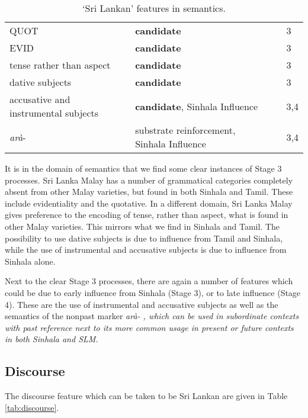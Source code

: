 \begin{table}[h!]
\centering
\begin{tabular}{p{4cm}p{4cm}p{2cm}l}
\hline
QUOT & \textbf{candidate} & \tiny \citet[340-346]{Nordhoff2009}&  3 \\
EVID & \textbf{candidate}  &\tiny \citet[337-340]{Nordhoff2009}&  3 \\
tense rather than aspect &   \textbf{candidate} & &  3 \\
dative subjects & \textbf{candidate}  &\tiny \citet[421-430]{Nordhoff2009}& 3 \\
\hline
accusative and instrumental subjects & \textbf{candidate}, Sinhala Influence & \tiny \citet[421-430]{Nordhoff2009} &  3,4 \\
 \emph{arà}- & substrate reinforcement, Sinhala Influence & \tiny \citet[253]{Nordhoff2009} &  3,4 \\
\end{tabular}
\caption{`Sri Lankan' features in semantics.}
\label{tab:semantics}
\end{table}

It is in the domain of semantics that we find some clear instances of Stage 3 processes. Sri Lanka Malay has a number of grammatical categories completely absent from other Malay varieties, but found in both Sinhala and Tamil. These include  evidentiality and the quotative.  
In a different domain, Sri Lanka Malay gives preference to the encoding of tense, rather than aspect, what is found in other Malay varieties. This mirrors what we find in Sinhala and Tamil. The possibility to use dative subjects is due to influence from Tamil and Sinhala, while the use of instrumental and accusative subjects is due to influence from Sinhala alone.

Next to the clear Stage 3 processes, there are again a number of features which could be due to early influence from Sinhala (Stage 3), or to late influence (Stage 4). These are the use of instrumental and accusative subjects as well as the semantics of the nonpast marker \em arà- \em, which can be used in subordinate contexts with past reference next to its more common usage in present or future contexts in both Sinhala and SLM.


\subsection{Discourse}
The discourse feature which can be taken to be Sri Lankan are given in Table \ref{tab:discourse}.

